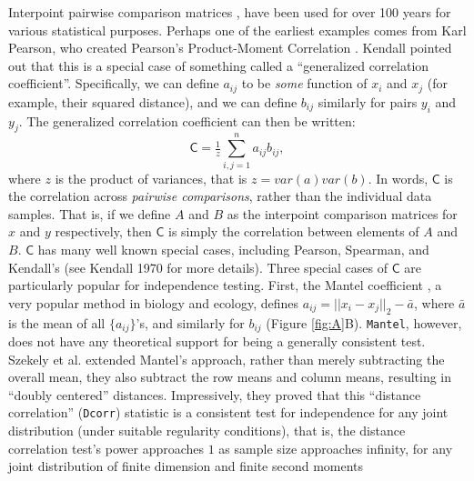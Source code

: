 \documentclass[11pt]{article}
\providecommand{\sct}[1]{{\sc \texttt{#1}}}
\newcommand{\G}{\mathsf{C}}
\newcommand{\Dcorr}{\sct{Dcorr}}
\newcommand{\Mantel}{\sct{Mantel}}
\begin{document}
Interpoint pairwise comparison matrices \cite{Maa83}, have been used for over 100 years for various statistical purposes. Perhaps one of the earliest examples  comes from  Karl Pearson, who created Pearson's Product-Moment Correlation \cite{Pearson1895}.  
Kendall  \cite{KendallBook} pointed out that this is a special case of something called a  ``generalized correlation coefficient''.
Specifically, we can define $a_{ij}$ to be \emph{some} function of $x_i$ and $x_j$  (for example, their squared distance), and we can define $b_{ij}$ similarly for pairs $y_i$ and $y_j$.  The generalized correlation coefficient can then be written:
\begin{equation}
\label{generalCoef}
\G= \tfrac{1}{z} {\textstyle \sum_{i,j=1}^n a_{ij} b_{ij} }
, 
\end{equation}
where $z$ is the product of variances, that is $z=var(a) var(b)$.
In words, $\G$ is the correlation across \emph{pairwise comparisons}, rather than the individual data samples.  That is, if we define $A$ and $B$ as the interpoint comparison matrices for $x$ and $y$ respectively, then $\G$ is simply the correlation between elements of $A$ and $B$.    
$\G$ has many well known special cases, including Pearson, Spearman, and Kendall's (see Kendall 1970 for more details). 
Three special cases of $\G$ are particularly popular for independence testing.  First, the Mantel coefficient \cite{Mantel1967}, a very popular method in biology and ecology, 
defines $a_{ij}=||x_i-x_j||_{2} - \bar{a}$, where $\bar{a}$ is the mean of all $\{a_{ij}\}$'s, and similarly for $b_{ij}$ 
(Figure \ref{fig:A}B). 
\Mantel, however, does not have any theoretical support for being a generally consistent test. 
Szekely et al. \cite{SzekelyRizzoBakirov2007} extended Mantel's approach, rather than merely subtracting the overall mean, they also subtract the row means and column means, resulting in ``doubly centered'' distances.  Impressively, they proved that this ``distance correlation'' (\Dcorr) statistic is a consistent test for independence for any joint distribution (under suitable regularity conditions), that is, the distance correlation test's power approaches $1$ as sample size approaches infinity, for any joint distribution of finite dimension and finite second moments
\end{document}

